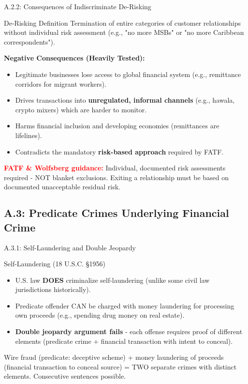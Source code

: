 \documentclass{beamer}
\begin{document}
	\begin{frame}{A.2.2: Consequences of Indiscriminate De-Risking}
		\begin{block}{De-Risking Definition}
			Termination of entire categories of customer relationships without individual risk assessment (e.g., "no more MSBs" or "no more Caribbean correspondents").
		\end{block}
		\textbf{Negative Consequences (Heavily Tested):}
		\begin{itemize}
			\item Legitimate businesses lose access to global financial system (e.g., remittance corridors for migrant workers).
			\item Drives transactions into \textbf{unregulated, informal channels} (e.g., hawala, crypto mixers) which are harder to monitor.
			\item Harms financial inclusion and developing economies (remittances are lifelines).
			\item Contradicts the mandatory \textbf{risk-based approach} required by FATF.
		\end{itemize}
		\textcolor{red}{\textbf{FATF \& Wolfsberg guidance:}} Individual, documented risk assessments required - NOT blanket exclusions. Exiting a relationship must be based on documented unacceptable residual risk.
	\end{frame}
	
	\subsection{A.3: Predicate Crimes Underlying Financial Crime}
	
	\begin{frame}{A.3.1: Self-Laundering and Double Jeopardy}
		\begin{block}{Self-Laundering (18 U.S.C. §1956)}
			\begin{itemize}
				\item U.S. law \textbf{DOES} criminalize self-laundering (unlike some civil law jurisdictions historically).
				\item Predicate offender CAN be charged with money laundering for processing own proceeds (e.g., spending drug money on real estate).
				\item \textbf{Double jeopardy argument fails} - each offense requires proof of different elements (predicate crime + financial transaction with intent to conceal).
			\end{itemize}
		\end{block}
		\begin{example}
			Wire fraud (predicate: deceptive scheme) + money laundering of proceeds (financial transaction to conceal source) = TWO separate crimes with distinct elements. Consecutive sentences possible.
		\end{example}
	\end{frame}
	
\end{document}
